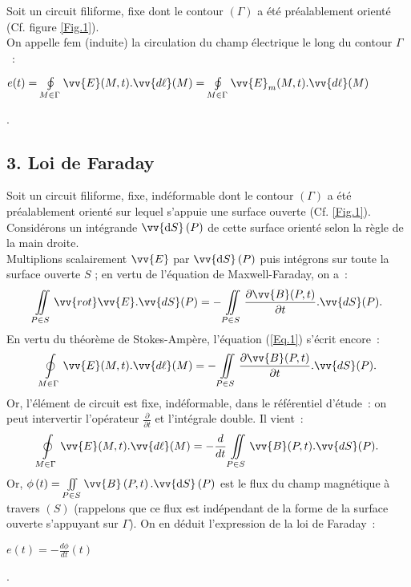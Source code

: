 \documentclass{article}
\newcommand{\mathcolorbox}[2]{\colorbox{#1}{$#2$}}
\let\oldiint\iint
\renewcommand{\iint}{\oldiint\limits}
\let\oldoint\oint
\renewcommand{\oint}{\oldoint\limits}
\renewcommand\overrightarrow{\vv}
\let\rot\relax
\DeclareMathOperator{\rot}{\overrightarrow{\mathrm{rot}}}
\begin{document}
Soit un circuit filiforme, fixe dont le contour $\left(\Gamma\right)$
a
été préalablement orienté (Cf. figure \ref{Fig.1}). \\
On appelle fem (induite) la circulation du champ électrique le long
du contour
$\Gamma$ : \\
\centerline{\mathcolorbox{gray!20}{e(t) = \oint_{M \in
\Gamma}\overrightarrow{E}(M,t).\overrightarrow{d\ell}(M) = \oint_{M
\in \Gamma}\overrightarrow{E}_{m}(M,t).\overrightarrow{d\ell}(M)}}.

\subsection*{3. Loi de Faraday}
Soit un circuit filiforme, fixe, indéformable dont le
contour $\left(\Gamma\right)$ a été préalablement orienté sur lequel s'appuie
une surface ouverte (Cf. \ref{Fig.1}). Considérons un intégrande
$\overrightarrow{\mathrm{d}S}\left(P\right)$ de cette surface orienté selon la règle
de la main droite. \\
Multiplions scalairement $\rot \overrightarrow{E}$
par $\overrightarrow{\mathrm{d}S}\left(P\right)$ puis intégrons sur toute la surface
ouverte $S$ ; en vertu de l'équation de Maxwell-Faraday, on a :
\begin{eqnarray}\label{Eq.1}
\iint_{P\in S}
\overrightarrow{rot}\overrightarrow{E}.\overrightarrow{dS}(P) =
-\iint_{P\in S} \frac{\partial \overrightarrow{B}(P,t)}{\partial
t}.\overrightarrow{dS}(P).
\end{eqnarray}
En vertu du théorème de Stokes-Ampère, l'équation (\ref{Eq.1})
s'écrit encore :
\begin{eqnarray}\label{Eq.2}
\oint_{M\in \Gamma}\overrightarrow{E}(M,t).\overrightarrow{d\ell}(M)
= -\iint_{P\in S} \frac{\partial \overrightarrow{B}(P,t)}{\partial
t}.\overrightarrow{dS}(P).
\end{eqnarray}
Or, l'élément de circuit est fixe, indéformable, dans le référentiel
d'étude : on peut intervertir l'opérateur $\frac{\partial}{\partial
t}$ et l'intégrale double. Il vient :
\begin{eqnarray}\label{Eq.3}
\oint_{M\in \Gamma}\overrightarrow{E}(M,t).\overrightarrow{d\ell}(M)
= - \frac{d}{dt}\iint_{P \in
S}\overrightarrow{B}(P,t).\overrightarrow{dS}(P).
\end{eqnarray}
Or, $\phi\left(t\right) = \iint_{P\in
S}\overrightarrow{B}\left(P,t\right).\overrightarrow{\mathrm{d}S}\left(P\right)$ est le flux du
champ magnétique à travers $\left(S\right)$ (rappelons que ce flux est
indépendant de la forme de la surface ouverte s'appuyant sur
$\Gamma$). On en déduit l'expression de la loi de Faraday : \\
\centerline{\mathcolorbox{gray!20}{e(t) = -\frac{d\phi}{dt}(t)}}.
\end{document}
